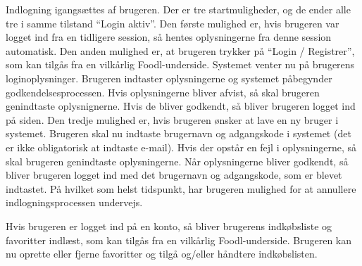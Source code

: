{Indlogning igangsættes af brugeren. Der er tre startmuligheder, og de ender alle tre i samme tilstand “Login aktiv”. Den første mulighed er, hvis brugeren var logget ind fra en tidligere session, så hentes oplysningerne fra denne session automatisk. Den anden mulighed er, at brugeren trykker på “Login / Registrer”, som kan tilgås fra en vilkårlig Foodl-underside. Systemet venter nu på brugerens loginoplysninger. Brugeren indtaster oplysningerne og systemet påbegynder godkendelsesprocessen. Hvis oplysningerne bliver afvist, så skal brugeren genindtaste oplysnignerne. Hvis de bliver godkendt, så bliver brugeren logget ind på siden. Den tredje mulighed er, hvis brugeren ønsker at lave en ny bruger i systemet. Brugeren skal nu indtaste brugernavn og adgangskode i systemet (det er ikke obligatorisk at indtaste e-mail). Hvis der opstår en fejl i oplysningerne, så skal brugeren genindtaste oplysningerne. Når oplysningerne bliver godkendt, så bliver brugeren logget ind med det brugernavn og adgangskode, som er blevet indtastet. På hvilket som helst tidspunkt, har brugeren mulighed for at annullere indlogningsprocessen undervejs.

Hvis brugeren er logget ind på en konto, så bliver brugerens indkøbsliste og favoritter indlæst, som kan tilgås fra en vilkårlig Foodl-underside. Brugeren kan nu oprette eller fjerne favoritter og tilgå og/eller håndtere indkøbslisten.}
{}
{}
